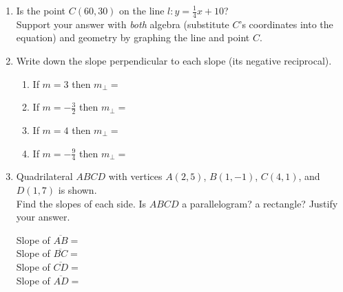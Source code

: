 \begin{enumerate}
\item Is the point $C(60,30)$ on the line $l: y=\frac{1}{4}x+10$? \\[0.5cm]
Support your answer with \emph{both} algebra (substitute $C$'s coordinates into the equation) and geometry by graphing the line and point $C$.
\begin{flushright}
  \end{flushright}

\item Write down the slope perpendicular to each slope (its negative reciprocal).
  \begin{enumerate}[itemsep=0.9cm]
    \item If $m = 3$ then $m_{\perp}=$
    \item If $\displaystyle m = -\frac{3}{2}$ then $m_{\perp}=$
    \item If $m = 4$ then $m_{\perp}=$
    \item If $\displaystyle m = -\frac{9}{4}$ then $m_{\perp}=$
  \end{enumerate}

\item Quadrilateral $ABCD$ with vertices $A(2,5)$, $B(1,-1)$, $C(4,1)$, and $D(1,7)$ is shown. \\[0.5cm]
Find the slopes of each side. Is $ABCD$ a parallelogram? a rectangle? Justify your answer.
\begin{multicols}{2}
  Slope of $\overline{AB}=$\\[1.5cm]
  Slope of $\overline{BC}=$\\[1.5cm]
  Slope of $\overline{CD}=$\\[1.5cm]
  Slope of $\overline{AD}=$\\
  \begin{flushright}
    \end{flushright}
  \end{multicols}


\end{enumerate}
